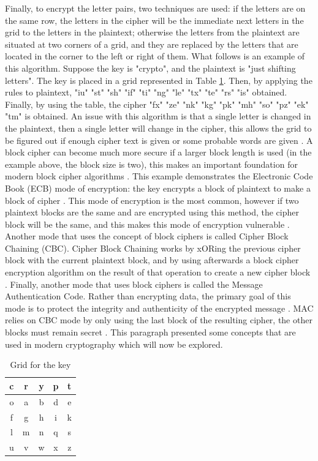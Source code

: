 \documentclass{l4proj}
\begin{document}
Finally, to encrypt the letter pairs, two techniques are used: if the letters are on the same row, the letters in the cipher will be the immediate next letters in the grid 
to the letters in the plaintext; otherwise the letters from the plaintext are situated at two corners of a grid, and they are replaced by the letters that are located in the corner to the left or right of them. 
What follows is an example of this algorithm. Suppose the key is "crypto", and the plaintext is "just shifting letters".
The key is placed in a grid represented in Table \ref{tab:key}. Then, by applying the rules to plaintext, "iu" "st" "sh" "if" "ti" "ng" "le" "tx" "te" "rs" "is" obtained.
Finally, by using the table, the cipher "fx" "ze" "nk" "kg" "pk" "mh" "so" "pz" "ek" "tm" is obtained. An issue with this algorithm is that a single letter is changed in the plaintext,
then a single letter will change in the cipher, this allows the grid to be figured out if enough cipher text is given or some probable words are given \citep{anderson_security_2008}.
A block cipher can become much more secure if a larger block length is used (in the example above, the block size is two), this makes an important foundation for modern block cipher algorithms
\citep{anderson_security_2008}. This example demonstrates the Electronic Code Book (ECB) mode of encryption: the key encrypts a block of plaintext to make a block of cipher \citep{kessler_overview_2016}.
This mode of encryption is the most common, however if two plaintext blocks are the same and are encrypted using this method, the cipher block will be the same, 
and this makes this mode of encryption vulnerable \citep{kessler_overview_2016}. Another mode that uses the concept of block ciphers is called Cipher Block Chaining (CBC).
Cipher Block Chaining works by xORing the previous cipher block with the current plaintext block, and by using afterwards a block cipher encryption algorithm
on the result of that operation to create a new cipher block \citep{savage_cse_2019} \citep{kessler_overview_2016}. 
Finally, another mode that uses block ciphers is called the Message Authentication Code. Rather than encrypting data, the primary goal of this mode is to protect the integrity
and authenticity of the encrypted message \citep{anderson_security_2008}. MAC relies on CBC mode by only using the last block of the resulting cipher, 
the other blocks must remain secret \citep{anderson_security_2008}. 
This paragraph presented some concepts that are used in modern cryptography which will now be explored.

    \begin{table}[]
    \centering
    \begin{tabular}{|c|c|c|c|c|}
        \hline
        c & r & y & p & t \\
        \hline
        o & a & b & d & e \\
        \hline
        f & g & h & i & k \\
        \hline
        l & m & n & q & s \\
        \hline
        u & v & w & x & z \\
        \hline
    \end{tabular}
    \caption{Grid for the key}\label{tab:key}
    \end{table}
\end{document}
